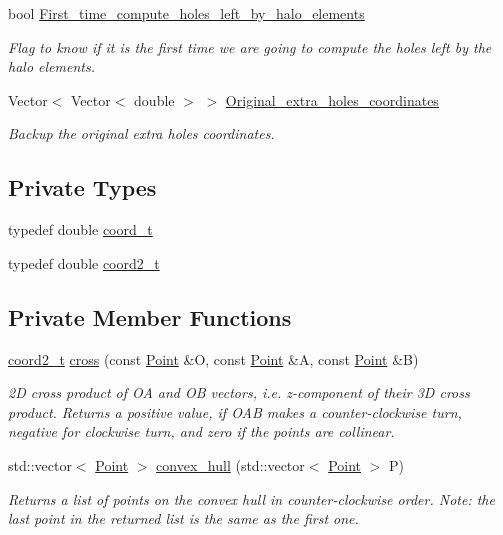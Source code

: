 \begin{DoxyCompactItemize}
bool \hyperlink{classoomph_1_1TriangleMesh_ab3953e0939e3fb86a1913faa4698d0b0}{First\+\_\+time\+\_\+compute\+\_\+holes\+\_\+left\+\_\+by\+\_\+halo\+\_\+elements}
\begin{DoxyCompactList}\small\item\em Flag to know if it is the first time we are going to compute the holes left by the halo elements. \end{DoxyCompactList}\item 
Vector$<$ Vector$<$ double $>$ $>$ \hyperlink{classoomph_1_1TriangleMesh_a70bba1b4d0565fa95b1bff6b034a5b7c}{Original\+\_\+extra\+\_\+holes\+\_\+coordinates}
\begin{DoxyCompactList}\small\item\em Backup the original extra holes coordinates. \end{DoxyCompactList}\end{DoxyCompactItemize}
\subsection*{Private Types}
\begin{DoxyCompactItemize}
\item 
typedef double \hyperlink{classoomph_1_1TriangleMesh_ad50b14a66b40a3bfb22a43df86c9006e}{coord\+\_\+t}
\item 
typedef double \hyperlink{classoomph_1_1TriangleMesh_afd4948d805e89116cc5da629e413a449}{coord2\+\_\+t}
\end{DoxyCompactItemize}
\subsection*{Private Member Functions}
\begin{DoxyCompactItemize}
\item 
\hyperlink{classoomph_1_1TriangleMesh_afd4948d805e89116cc5da629e413a449}{coord2\+\_\+t} \hyperlink{classoomph_1_1TriangleMesh_a83f8fd5592a7ba062eec9390b7b84426}{cross} (const \hyperlink{structoomph_1_1TriangleMesh_1_1Point}{Point} \&O, const \hyperlink{structoomph_1_1TriangleMesh_1_1Point}{Point} \&A, const \hyperlink{structoomph_1_1TriangleMesh_1_1Point}{Point} \&B)
\begin{DoxyCompactList}\small\item\em 2D cross product of OA and OB vectors, i.\+e. z-\/component of their 3D cross product. Returns a positive value, if O\+AB makes a counter-\/clockwise turn, negative for clockwise turn, and zero if the points are collinear. \end{DoxyCompactList}\item 
std\+::vector$<$ \hyperlink{structoomph_1_1TriangleMesh_1_1Point}{Point} $>$ \hyperlink{classoomph_1_1TriangleMesh_a97228c6d359e1e58efb45dcba1386969}{convex\+\_\+hull} (std\+::vector$<$ \hyperlink{structoomph_1_1TriangleMesh_1_1Point}{Point} $>$ P)
\begin{DoxyCompactList}\small\item\em Returns a list of points on the convex hull in counter-\/clockwise order. Note\+: the last point in the returned list is the same as the first one. \end{DoxyCompactList}\end{DoxyCompactItemize}


